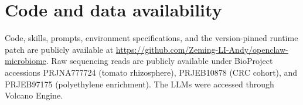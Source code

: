 \documentclass[10pt,letterpaper]{article}
\begin{document}
\section*{Code and data availability}

Code, skills, prompts, environment specifications, and the version-pinned
runtime patch are publicly available at \url{https://github.com/Zeming-LI-Andy/openclaw-microbiome}.
Raw sequencing reads are publicly available under BioProject accessions
PRJNA777724 (tomato rhizosphere), PRJEB10878 (CRC cohort), and PRJEB97175
(polyethylene enrichment). The LLMs were accessed through Volcano Engine.

\clearpage




\end{document}
